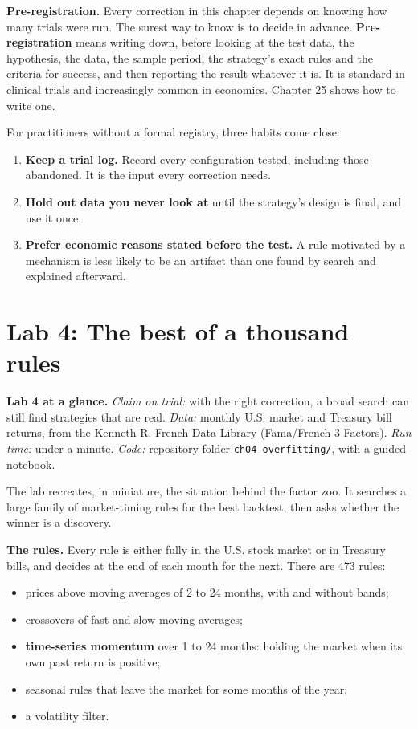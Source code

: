 \textbf{Pre-registration.} Every correction in this chapter depends on knowing how many trials were run. The surest way to know is to decide in advance. \textbf{Pre-registration} means writing down, before looking at the test data, the hypothesis, the data, the sample period, the strategy's exact rules and the criteria for success, and then reporting the result whatever it is. It is standard in clinical trials and increasingly common in economics. Chapter 25 shows how to write one.

For practitioners without a formal registry, three habits come close:

\begin{enumerate}
  \item \textbf{Keep a trial log.} Record every configuration tested, including those abandoned. It is the input every correction needs.
  \item \textbf{Hold out data you never look at} until the strategy's design is final, and use it once.
  \item \textbf{Prefer economic reasons stated before the test.} A rule motivated by a mechanism is less likely to be an artifact than one found by search and explained afterward.
\end{enumerate}

\section{Lab 4: The best of a thousand rules}
\label{sec:04-lab}

\begin{callout}
\textbf{Lab 4 at a glance.} \emph{Claim on trial:} with the right correction, a broad search can still find strategies that are real. \emph{Data:} monthly U.S. market and Treasury bill returns, from the Kenneth R. French Data Library (Fama/French 3 Factors). \emph{Run time:} under a minute. \emph{Code:} repository folder \texttt{ch04-overfitting/}, with a guided notebook.
\end{callout}

The lab recreates, in miniature, the situation behind the factor zoo. It searches a large family of market-timing rules for the best backtest, then asks whether the winner is a discovery.

\textbf{The rules.} Every rule is either fully in the U.S. stock market or in Treasury bills, and decides at the end of each month for the next. There are 473 rules:

\begin{itemize}
  \item prices above moving averages of 2 to 24 months, with and without bands;
  \item crossovers of fast and slow moving averages;
  \item \textbf{time-series momentum} over 1 to 24 months: holding the market when its own past return is positive;
  \item seasonal rules that leave the market for some months of the year;
  \item a volatility filter.
\end{itemize}

